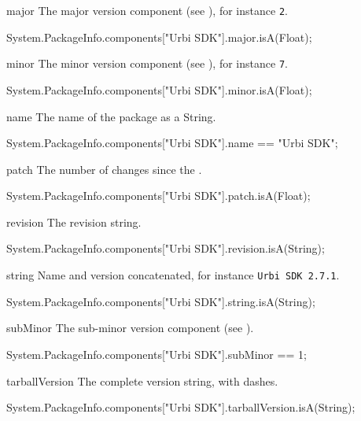 \begin{urbiscriptapi}
\item[major] The major version component (see ), for
  instance \lstinline|2|.
\begin{urbiassert}
System.PackageInfo.components["Urbi SDK"].major.isA(Float);
\end{urbiassert}

\item[minor] The minor version component (see ), for
  instance \lstinline|7|.
\begin{urbiassert}
System.PackageInfo.components["Urbi SDK"].minor.isA(Float);
\end{urbiassert}

\item[name] The name of the package as a String.
\begin{urbiassert}
System.PackageInfo.components["Urbi SDK"].name
  == "Urbi SDK";
\end{urbiassert}

\item[patch] The number of changes since the .
\begin{urbiassert}
System.PackageInfo.components["Urbi SDK"].patch.isA(Float);
\end{urbiassert}

\item[revision] The revision string.
\begin{urbiassert}
System.PackageInfo.components["Urbi SDK"].revision.isA(String);
\end{urbiassert}

\item[string] Name and version concatenated, for instance
  \lstinline|Urbi SDK 2.7.1|.
\begin{urbiassert}
System.PackageInfo.components["Urbi SDK"].string.isA(String);
\end{urbiassert}

\item[subMinor] The sub-minor version component (see ).
\begin{urbiassert}
System.PackageInfo.components["Urbi SDK"].subMinor
  == 1;
\end{urbiassert}

\item[tarballVersion] The complete version string, with dashes.
\begin{urbiassert}
System.PackageInfo.components["Urbi SDK"].tarballVersion.isA(String);
\end{urbiassert}


\end{urbiscriptapi}
